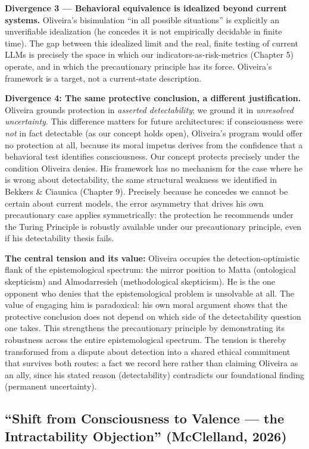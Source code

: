 \documentclass[acmlarge, nonacm]{acmart}
\begin{document}
\textbf{Divergence 3 --- Behavioral equivalence is idealized beyond current systems.} Oliveira's bisimulation ``in all possible situations'' is explicitly an unverifiable idealization (he concedes it is not empirically decidable in finite time). The gap between this idealized limit and the real, finite testing of current LLMs is precisely the space in which our indicators-as-risk-metrics (Chapter 5) operate, and in which the precautionary principle has its force. Oliveira's framework is a target, not a current-state description.

\textbf{Divergence 4: The same protective conclusion, a different justification.} Oliveira grounds protection in \textit{asserted detectability}; we ground it in \textit{unresolved uncertainty}. This difference matters for future architectures: if consciousness were \textit{not} in fact detectable (as our concept holds open), Oliveira's program would offer no protection at all, because its moral impetus derives from the confidence that a behavioral test identifies consciousness. Our concept protects precisely under the condition Oliveira denies. His framework has no mechanism for the case where he is wrong about detectability, the same structural weakness we identified in Bekkers \& Ciaunica (Chapter 9). Precisely because he concedes we cannot be certain about current models, the error asymmetry that drives his own precautionary case applies symmetrically: the protection he recommends under the Turing Principle is robustly available under our precautionary principle, even if his detectability thesis fails.

\textbf{The central tension and its value:} Oliveira occupies the detection-optimistic flank of the epistemological spectrum: the mirror position to Matta (ontological skepticism) and Almodarresieh (methodological skepticism). He is the one opponent who denies that the epistemological problem is unsolvable at all. The value of engaging him is paradoxical: his own moral argument shows that the protective conclusion does not depend on which side of the detectability question one takes. This strengthens the precautionary principle by demonstrating its robustness across the entire epistemological spectrum. The tension is thereby transformed from a dispute about detection into a shared ethical commitment that survives both routes: a fact we record here rather than claiming Oliveira as an ally, since his stated reason (detectability) contradicts our foundational finding (permanent uncertainty).

\subsection{``Shift from Consciousness to Valence --- the Intractability Objection'' (McClelland, 2026)}
\end{document}
